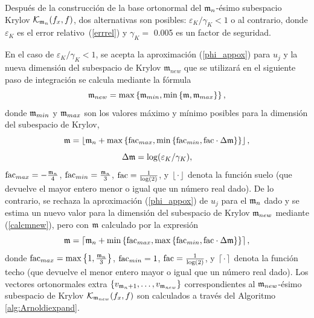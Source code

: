 Después de la construcción de la base ortonormal del $\mathfrak{m}_n$-ésimo subespacio Krylov $\mathcal{K}_{\mathfrak{m}_n}(f_x,f)$, dos alternativas son posibles: $\varepsilon_{K}/\gamma_{K}< 1$ o al contrario, donde $\varepsilon_{K}$
es el error relativo~(\ref{errrel}) y $\gamma_{K}=$ 0.005 es un factor de seguridad.

En el caso de $\varepsilon_{K}/\gamma_{K}< 1$, se acepta la aproximación (\ref{phi_appox}) para $u_j$ y la nueva dimensión del subespacio de Krylov $\mathfrak{m}_{new}$ que se utilizará en el siguiente paso de integración se calcula mediante la fórmula
\begin{equation}\label{calcmnew}
    \mathfrak{m}_{new}= \max\left\{ \mathfrak{m}_{min}, \min\left\{ \mathfrak{m} , \mathfrak{m}_{max}  \right\} \right\},
\end{equation}
    donde $\mathfrak{m}_{min}$ y $\mathfrak{m}_{max}$ son los valores máximo y mínimo posibles para la dimensión del subespacio de Krylov,
\begin{equation*}
    \mathfrak{m} = \left\lfloor \mathfrak{m}_{n} + \max\left\{ \mathrm{fac}_{max} , \min\left\{ \mathrm{fac}_{min},
            \mathrm{fac}\cdot\Delta\mathfrak{m} \right\}  \right\} \right\rfloor,
\end{equation*}
\begin{equation}
    \Delta\mathfrak{m}=\log(\varepsilon_{K}/\gamma_{K}), \label{delta_m}
\end{equation}
$\mathrm{fac}_{max}= -\frac{\mathfrak{m}_n}{4}$, $\mathrm{fac}_{min}= \frac{\mathfrak{m}_n}{3}$, $\mathrm{fac}=\frac{1}{\log( 2)}$, y $\left\lfloor \cdot \right\rfloor$ denota la función suelo (que devuelve el mayor entero menor o igual que un número real dado). De lo contrario, se rechaza la aproximación (\ref{phi_appox}) de $u_j$ para el $\mathfrak{m}_n$ dado y se estima un nuevo valor para la dimensión del subespacio de Krylov $\mathfrak{m}_{new}$ mediante (\ref{calcmnew}), pero con $\mathfrak{m}$ calculado por la expresión
\begin{equation*}
    \mathfrak{m} = \left\lceil \mathfrak{m}_{n} + \min\left\{ \mathrm{fac}_{max} , \max\left\{ \mathrm{fac}_{min},
            \mathrm{fac}\cdot\Delta\mathfrak{m} \right\}  \right\} \right\rceil,
\end{equation*}
donde $\mathrm{fac}_{max}= \max\left\{  1,\frac{\mathfrak{m}_{n}}{3}  \right\}$, $\mathrm{fac}_{min}= 1 $, $\mathrm{fac}=\frac{1}{\log (2)}$, y $\left\lceil \cdot \right\rceil$ denota la función techo (que devuelve el menor entero mayor o igual que un número real dado). Los vectores ortonormales extra $\{v_{\mathfrak{m}_n+1},\ldots,v_{\mathfrak{m}_{new}} \}$ correspondientes al $\mathfrak{m}_{new}$-ésimo subespacio de Krylov $\mathcal{K}_{\mathfrak{m}_{new}}(f_x,f)$ son calculados a través del Algoritmo \ref{alg:Arnoldiexpand}.
